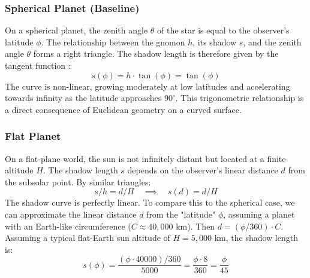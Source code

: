 \documentclass[11pt]{article}
\begin{document}
\subsubsection{Spherical Planet (Baseline)}
On a spherical planet, the zenith angle $\theta$ of the star is equal to the observer's latitude $\phi$. The relationship between the gnomon $h$, its shadow $s$, and the zenith angle $\theta$ forms a right triangle. The shadow length is therefore given by the tangent function \cite{Cox2011}:
\begin{equation}
    s(\phi) = h \cdot \tan(\phi) = \tan(\phi)
    \label{eq:shadow_sphere}
\end{equation}
The curve is non-linear, growing moderately at low latitudes and accelerating towards infinity as the latitude approaches $90^{\circ}$. This trigonometric relationship is a direct consequence of Euclidean geometry on a curved surface.

\subsubsection{Flat Planet}
On a flat-plane world, the sun is not infinitely distant but located at a finite altitude $H$. The shadow length $s$ depends on the observer's linear distance $d$ from the subsolar point. By similar triangles:
\begin{equation}
    s/h = d/H \quad \implies \quad s(d) = d/H
    \label{eq:shadow_flat}
\end{equation}
The shadow curve is perfectly linear. To compare this to the spherical case, we can approximate the linear distance $d$ from the "latitude" $\phi$, assuming a planet with an Earth-like circumference ($C \approx 40,000$ km). Then $d = (\phi/360) \cdot C$. Assuming a typical flat-Earth sun altitude of $H = 5,000$ km, the shadow length is:
\[
s(\phi) = \frac{ (\phi \cdot 40000) / 360 }{5000} = \frac{\phi \cdot 8}{360} = \frac{\phi}{45}
\]
\end{document}
